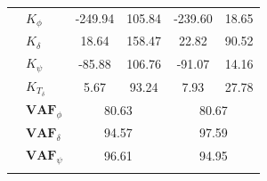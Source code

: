 \begin{table}[]
\begin{tabular}{llcccc}
                                                   & $K_{\phi} $                                                      & -249.94                                     & 105.84                                               & -239.60                                     & 18.65                                                \\
                                                   & $K_\delta $                                                      & 18.64                                       & 158.47                                               & 22.82                                       & 90.52                                                \\
                                                   & $K_\psi $                                                        & -85.88                                      & 106.76                                               & -91.07                                      & 14.16                                                \\
                                                   & $K_{T_\delta}$                                                   & 5.67                                        & 93.24                                                & 7.93                                        & 27.78                                                \\ \cline{2-6} 
                                                   & $\mathbf{VAF}_\phi$                                              & \multicolumn{2}{c}{80.63}                                                                          & \multicolumn{2}{c}{80.67}                                                                          \\
                                                   & $\mathbf{VAF}_\delta$                                            & \multicolumn{2}{c}{94.57}                                                                          & \multicolumn{2}{c}{97.59}                                                                          \\
                                                   & $\mathbf{VAF}_\psi$                                              & \multicolumn{2}{c}{96.61}                                                                          & \multicolumn{2}{c}{94.95}                                                                          \\
                                                   &                                                                  & \multicolumn{1}{l}{}                        & \multicolumn{1}{l}{}                                 & \multicolumn{1}{l}{}                        & \multicolumn{1}{l}{}                                 \\ \hline

\end{tabular}
\end{table}
